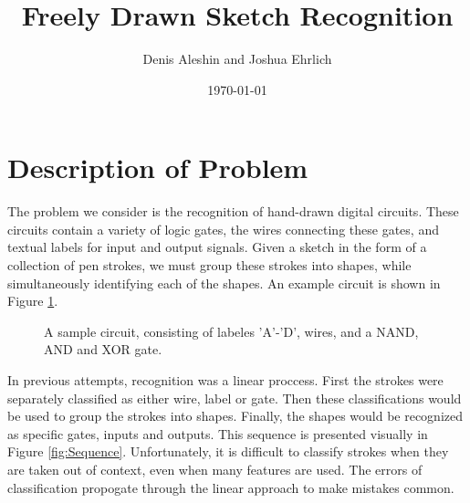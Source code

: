 \documentclass{article}
\title{Freely Drawn Sketch Recognition}
\author{Denis Aleshin and Joshua Ehrlich}
\date{\today}
\begin{document}
\maketitle
\section{Description of Problem}
The problem we consider is the recognition of hand-drawn digital circuits. These circuits contain a variety of logic gates, the wires connecting these gates, and textual labels for input and output signals. Given a sketch in the form of a collection of pen strokes, we must group these strokes into shapes, while simultaneously identifying each of the shapes. An example circuit is shown in Figure \ref{fig:Circuit}.

\begin{figure}[h!]
\centering
{}
\caption{A sample circuit, consisting of labeles 'A'-'D', wires, and a NAND, AND and XOR gate.}
\label{fig:Circuit}
\end{figure}

In previous attempts, recognition was a linear proccess. First the strokes were separately classified as either wire, label or gate. Then these classifications would be used to group the strokes into shapes. Finally, the shapes would be recognized as specific gates, inputs and outputs. This sequence is presented visually in Figure \ref{fig:Sequence}. Unfortunately, it is difficult to classify strokes when they are taken out of context, even when many features are used. The errors of classification propogate through the linear approach to make mistakes common.
\end{document}
